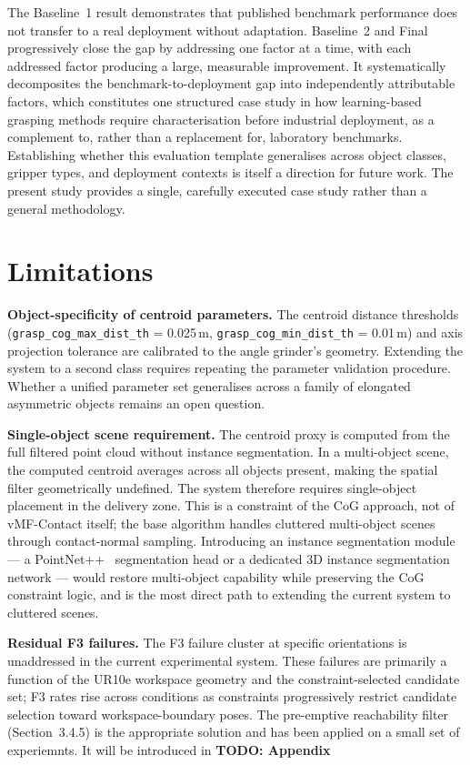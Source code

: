 \documentclass[12pt, a4paper]{report}
\newcommand{\param}[1]{\texttt{#1}}
\begin{document}
The Baseline~1 result demonstrates that published benchmark performance does not transfer to a real deployment without adaptation. Baseline~2 and Final progressively close the gap by addressing one factor at a time, with each addressed factor producing a large, measurable improvement. It systematically decomposites the benchmark-to-deployment gap into independently attributable factors, which constitutes one structured case study in how learning-based grasping methods require characterisation before industrial deployment, as a complement to, rather than a replacement for, laboratory benchmarks. Establishing whether this evaluation template generalises across object classes, gripper types, and deployment contexts is itself a direction for future work. The present study provides a single, carefully executed case study rather than a general methodology.

\section{Limitations}
\label{sec:limitations}

\textbf{Object-specificity of centroid parameters.} The centroid distance thresholds (\param{grasp\_cog\_max\_dist\_th} = 0.025\,m, \param{grasp\_cog\_min\_dist\_th} = 0.01\,m) and axis projection tolerance are calibrated to the angle grinder's geometry. Extending the system to a second class requires repeating the parameter validation procedure. Whether a unified parameter set generalises across a family of elongated asymmetric objects remains an open question.

\textbf{Single-object scene requirement.} The centroid proxy is computed from the full filtered point cloud without instance segmentation. In a multi-object scene, the computed centroid averages across all objects present, making the spatial filter geometrically undefined. The system therefore requires single-object placement in the delivery zone. This is a constraint of the CoG approach, not of vMF-Contact itself; the base algorithm handles cluttered multi-object scenes through contact-normal sampling. Introducing an instance segmentation module --- a PointNet++~\cite{qi2017pointnet2} segmentation head or a dedicated 3D instance segmentation network --- would restore multi-object capability while preserving the CoG constraint logic, and is the most direct path to extending the current system to cluttered scenes.

\textbf{Residual F3 failures.} The F3 failure cluster at specific orientations is unaddressed in the current experimental system. These failures are primarily a function of the UR10e workspace geometry and the constraint-selected candidate set; F3 rates rise across conditions as constraints progressively restrict candidate selection toward workspace-boundary poses. The pre-emptive reachability filter (Section~3.4.5) is the appropriate solution and has been applied on a small set of experiemnts. It will be introduced in \textbf{TODO: Appendix}
\end{document}
